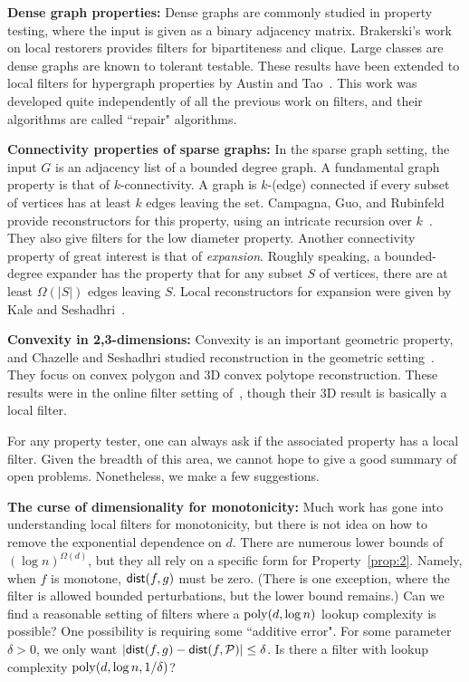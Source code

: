 \documentclass[natbib]{svcyclop}
\def\dist{{\sf dist}}
\begin{document}
{\bf Dense graph properties:} Dense graphs are commonly studied in property testing, where
the input is given as a binary adjacency matrix. Brakerski's work on local restorers provides
filters for bipartiteness and clique. Large classes are dense graphs are known
to tolerant testable. These results have been extended to local filters
for hypergraph properties by Austin and Tao~\cite{AT09}. This work was developed quite independently
of all the previous work on filters, and their algorithms are called ``repair"
algorithms.

{\bf Connectivity properties of sparse graphs:} In the sparse graph setting, the input $G$
is an adjacency list of a bounded degree graph. A fundamental graph property is that of $k$-connectivity.
A graph is $k$-(edge) connected if every subset of vertices has at least $k$ edges leaving the set.
Campagna, Guo, and Rubinfeld provide reconstructors for this property, using an intricate
recursion over $k$~\cite{CaGuRu13}. They also give filters for the low diameter property.
Another connectivity property of great interest is that of \emph{expansion}.
Roughly speaking, a bounded-degree expander has the property that for any subset $S$ of vertices, there
are at least $\Omega(|S|)$ edges leaving $S$.
Local reconstructors for expansion were given by Kale and Seshadhri~\cite{KalS11-j}.

{\bf Convexity in 2,3-dimensions:} Convexity is an important geometric property, and 
Chazelle and Seshadhri studied reconstruction in the geometric setting~\cite{ChSe11-j}. They focus
on convex polygon and 3D convex polytope reconstruction. These results were in the online filter
setting of~\cite{ACCL2}, though their 3D result is basically a local filter. 

\OpenProb

For any property tester, one can always ask if the associated property has a local filter.
Given the breadth of this area, we cannot hope to give a good summary of open problems. Nonetheless,
we make a few suggestions.

{\bf The curse of dimensionality for monotonicity:} Much work has gone into understanding local filters
for monotonicity, but there is not idea on how to remove the exponential dependence on $d$.
There are numerous lower bounds of $(\log n)^{\Omega(d)}$, but they all rely on a specific form for Property~\ref{prop:2}.
Namely, when $f$ is monotone, $\dist(f,g)$ must be zero. (There is one exception, where the filter is allowed
bounded perturbations, but the lower bound remains.) Can we find a reasonable setting of filters where
a $\mathrm{poly}(d,\log n)$ lookup complexity is possible? One possibility is requiring some ``additive error".
For some parameter $\delta > 0$, we only want $|\dist(f,g) - \dist(f,\cP)| \leq \delta$. Is there a filter
with lookup complexity $\mathrm{poly}(d,\log n,1/\delta)$?
\end{document}
